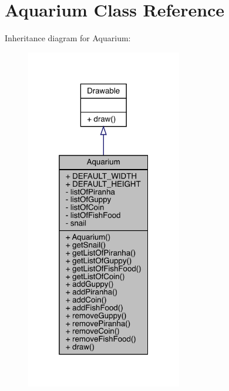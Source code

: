 \hypertarget{class_aquarium}{}\section{Aquarium Class Reference}
\label{class_aquarium}


Inheritance diagram for Aquarium\+:
\nopagebreak
\begin{figure}[H]
\begin{center}
\leavevmode
\includegraphics[width=193pt]{class_aquarium__inherit__graph}
\end{center}
\end{figure}


